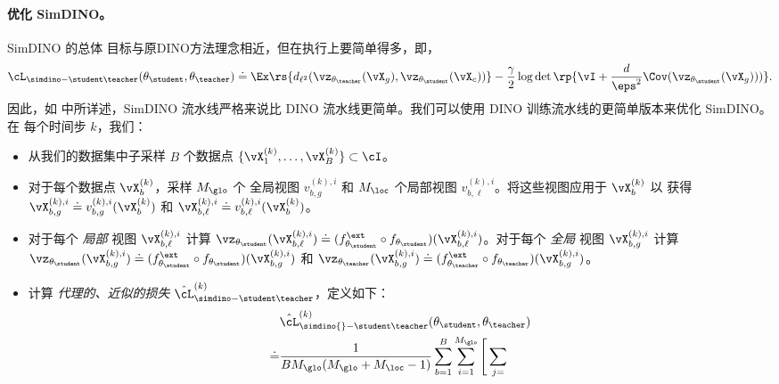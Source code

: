 \documentclass[../../book-main_zh.tex]{subfiles}
\begin{document}
\paragraph{优化 SimDINO。} SimDINO 的总体
目标与原DINO方法理念相近，但在执行上要简单得多，即，
\begin{equation}\label{eq:simdino_loss_teacherstudent}
    \cL_{\simdino-\student\teacher}(\theta_{\student}, \theta_{\teacher}) \doteq
    \Ex\rs{d_{\ell^{2}}(\vz_{\theta_{\teacher}}(\vX_{g}),
    \vz_{\theta_{\student}}(\vX_{c}))} - \frac{\gamma}{2}\log\det\rp{\vI
+ \frac{d}{\eps^{2}}\Cov(\vz_{\theta_{\student}}(\vX_{g})))}.
\end{equation}
因此，如  中所详述，SimDINO
流水线严格来说比 DINO 流水线更简单。我们可以使用
DINO 训练流水线的更简单版本来优化 SimDINO。在
每个时间步 \(k\)，我们：
\begin{itemize}
\item 从我们的数据集中子采样 \(B\) 个数据点 \(\{\vX_{1}^{(k)},
    \dots, \vX_{B}^{(k)}\} \subset \cI\)。
\item 对于每个数据点 \(\vX_{b}^{(k)}\)，采样 \(M_{\glo}\) 个
    全局视图 \(v_{b, g}^{(k), i}\) 和 \(M_{\loc}\) 个局部视图
    \(v_{b, \ell}^{(k), i}\)。将这些视图应用于 \(\vX_{b}^{(k)}\) 以
    获得 \(\vX_{b, g}^{(k), i} \doteq v_{b, g}^{(k),
    i}(\vX_{b}^{(k)})\) 和 \(\vX_{b, \ell}^{(k), i} \doteq v_{b,
    \ell}^{(k), i}(\vX_{b}^{(k)})\)。
\item 对于每个 \textit{局部} 视图 \(\vX_{b, \ell}^{(k), i}\) 计算
    \(\vz_{\theta_{\student}}(\vX_{b, \ell}^{(k), i}) \doteq
        (f_{\theta_{\student}}^{\ext} \circ
    f_{\theta_{\student}})(\vX_{b, \ell}^{(k), i})\)。对于每个
    \textit{全局} 视图 \(\vX_{b, g}^{(k), i}\) 计算
    \(\vz_{\theta_{\student}}(\vX_{b, g}^{(k), i}) \doteq
        (f_{\theta_{\student}}^{\ext} \circ
    f_{\theta_{\student}})(\vX_{b, g}^{(k), i})\) 和
    \(\vz_{\theta_{\teacher}}(\vX_{b, g}^{(k), i}) \doteq
        (f_{\theta_{\teacher}}^{\ext} \circ
    f_{\theta_{\teacher}})(\vX_{b, g}^{(k), i})\)。
\item 计算 \textit{代理的、近似的损失}
    \(\hat{\cL}_{\simdino-\student\teacher}^{(k)}\)，定义如下：
    \begin{align}\label{eq:simdino_loss_teacherstudent_empirical}
        &\hat{\cL}_{\simdino{}-\student\teacher}^{(k)}(\theta_{\student},
        \theta_{\teacher}) \nonumber \\
        \doteq &
        \frac{1}{BM_{\glo}(M_{\glo} + M_{\loc} - 1)}\sum_{b =
        1}^{B}\sum_{i = 1}^{M_{\glo}}\Bigg[\sum_{j =
}
\end{align}
\end{itemize}
\end{document}
